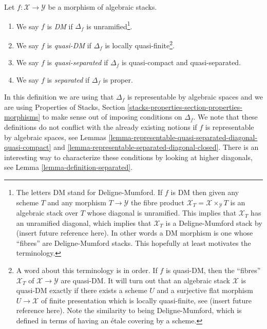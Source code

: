 \begin{definition}
\label{definition-separated}
Let $f : \mathcal{X} \to \mathcal{Y}$ be a morphism of algebraic stacks.
\begin{enumerate}
\item We say $f$ is {\it DM} if $\Delta_f$ is unramified\footnote{The
letters DM stand for Deligne-Mumford. If $f$ is DM then given any scheme
$T$ and any morphism $T \to \mathcal{Y}$ the fibre product
$\mathcal{X}_T = \mathcal{X} \times_{\mathcal{Y}} T$
is an algebraic stack over $T$ whose diagonal is unramified.
This implies that $\mathcal{X}_T$ has an unramified
diagonal, which implies that $\mathcal{X}_T$
is a Deligne-Mumford stack by (insert future reference here).
In other words a DM morphism is one whose ``fibres'' are Deligne-Mumford
stacks. This hopefully at least motivates the terminology.}.
\item We say $f$ is {\it quasi-DM} if $\Delta_f$ is
locally quasi-finite\footnote{A word about this terminology
is in order. If $f$ is quasi-DM, then the ``fibres'' $\mathcal{X}_T$ of
$\mathcal{X} \to \mathcal{Y}$ are quasi-DM. It will turn out that an
algebraic stack $\mathcal{X}$ is quasi-DM exactly if there exists a
scheme $U$ and a surjective flat morphism $U \to \mathcal{X}$ of finite
presentation which is locally quasi-finite, see (insert future
reference here). Note the similarity to being Deligne-Mumford, which
is defined in terms of having an \'etale covering by a scheme.}.
\item We say $f$ is {\it quasi-separated} if $\Delta_f$
is quasi-compact and quasi-separated.
\item We say $f$ is {\it separated} if $\Delta_f$ is proper.
\end{enumerate}
\end{definition}

\noindent
In this definition we are using that $\Delta_f$ is representable by algebraic
spaces and we are using
Properties of Stacks,
Section \ref{stacks-properties-section-properties-morphisms}
to make sense out of imposing conditions on $\Delta_f$.
We note that these definitions do not conflict with the already
existing notions if $f$ is representable by algebraic spaces, see
Lemmas \ref{lemma-representable-quasi-separated-diagonal-quasi-compact} and
\ref{lemma-representable-separated-diagonal-closed}.
There is an interesting way to characterize these conditions by looking
at higher diagonals, see
Lemma \ref{lemma-definition-separated}.

